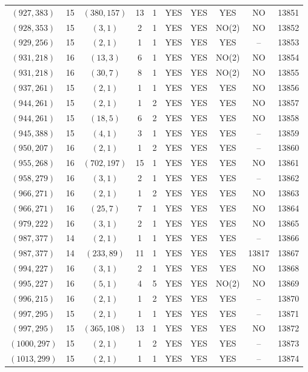 \begin{longtable}{|c|c|c|c|c|c|c|c|c|c|}
$(927, 383)$ & 15 & $(380, 157)$ & 13 & 1 & YES & YES & YES & NO & 13851\\
$(928, 353)$ & 15 & $(3, 1)$ & 2 & 1 & YES & YES & NO(2) & NO & 13852\\
$(929, 256)$ & 15 & $(2, 1)$ & 1 & 1 & YES & YES & YES & -- & 13853\\
$(931, 218)$ & 16 & $(13, 3)$ & 6 & 1 & YES & YES & NO(2) & NO & 13854\\
$(931, 218)$ & 16 & $(30, 7)$ & 8 & 1 & YES & YES & NO(2) & NO & 13855\\
$(937, 261)$ & 15 & $(2, 1)$ & 1 & 1 & YES & YES & YES & NO & 13856\\
$(944, 261)$ & 15 & $(2, 1)$ & 1 & 2 & YES & YES & YES & NO & 13857\\
$(944, 261)$ & 15 & $(18, 5)$ & 6 & 2 & YES & YES & YES & NO & 13858\\
$(945, 388)$ & 15 & $(4, 1)$ & 3 & 1 & YES & YES & YES & -- & 13859\\
$(950, 207)$ & 16 & $(2, 1)$ & 1 & 2 & YES & YES & YES & -- & 13860\\
$(955, 268)$ & 16 & $(702, 197)$ & 15 & 1 & YES & YES & YES & NO & 13861\\
$(958, 279)$ & 16 & $(3, 1)$ & 2 & 1 & YES & YES & YES & -- & 13862\\
$(966, 271)$ & 16 & $(2, 1)$ & 1 & 2 & YES & YES & YES & NO & 13863\\
$(966, 271)$ & 16 & $(25, 7)$ & 7 & 1 & YES & YES & YES & NO & 13864\\
$(979, 222)$ & 16 & $(3, 1)$ & 2 & 1 & YES & YES & YES & NO & 13865\\
$(987, 377)$ & 14 & $(2, 1)$ & 1 & 1 & YES & YES & YES & -- & 13866\\
$(987, 377)$ & 14 & $(233, 89)$ & 11 & 1 & YES & YES & YES & 13817 & 13867\\
$(994, 227)$ & 16 & $(3, 1)$ & 2 & 1 & YES & YES & YES & NO & 13868\\
$(995, 227)$ & 16 & $(5, 1)$ & 4 & 5 & YES & YES & NO(2) & NO & 13869\\
$(996, 215)$ & 16 & $(2, 1)$ & 1 & 2 & YES & YES & YES & -- & 13870\\
$(997, 295)$ & 15 & $(2, 1)$ & 1 & 1 & YES & YES & YES & -- & 13871\\
$(997, 295)$ & 15 & $(365, 108)$ & 13 & 1 & YES & YES & YES & NO & 13872\\
$(1000, 297)$ & 15 & $(2, 1)$ & 1 & 2 & YES & YES & YES & -- & 13873\\
$(1013, 299)$ & 15 & $(2, 1)$ & 1 & 1 & YES & YES & YES & -- & 13874\\

\end{longtable}
